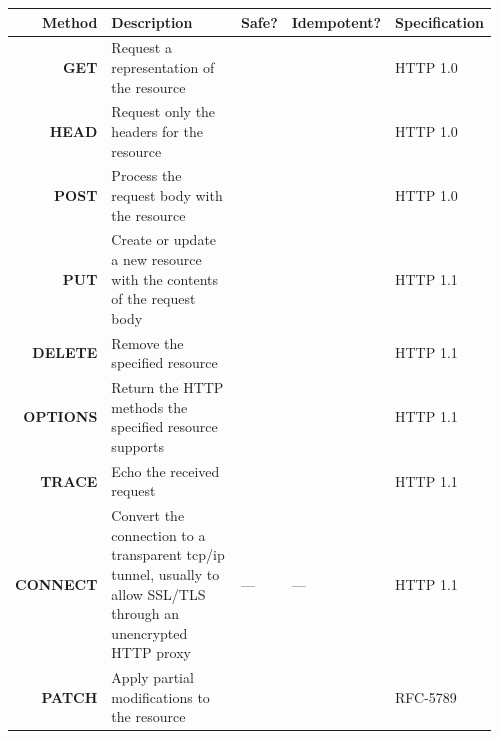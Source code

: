 \documentclass[final,table]{beamer}
\newcommand{\yes}{\color{green!60!black}{yes}}
\newcommand{\no}{\color{red}{no}}
\newcommand{\method}[1]{\textbf{#1}}
\begin{document}
\begin{frame}{}
    \begin{columns}
      \begin{column}{0.05\textwidth}
      \end{column}
      \begin{column}{0.9\textwidth}
        \begin{block}{}
          \Huge
          \begin{tabular}{r p{} l l l}
            Method & Description & Safe? & Idempotent? & Specification \\ \hline
            \method{GET} & Request a representation of the resource & \yes & \yes & HTTP 1.0 \\
            \method{HEAD} & Request only the headers for the resource & \yes & \yes &HTTP 1.0 \\
            \method{POST} & Process the request body with the resource & \no & \no & HTTP 1.0 \\
            \method{PUT} & Create or update a new resource with the contents of the request body & \no & \yes & HTTP 1.1 \\
            \method{DELETE} & Remove the specified resource & \no & \yes & HTTP 1.1 \\
            \method{OPTIONS} & Return the HTTP methods the specified resource supports & \yes & \yes & HTTP 1.1 \\
            \method{TRACE} & Echo the received request & \yes & \yes & HTTP 1.1 \\
            \method{CONNECT} & Convert the connection to a transparent tcp/ip tunnel, usually to allow SSL/TLS through an unencrypted HTTP proxy & --- & --- & HTTP 1.1 \\
            \method{PATCH} & Apply partial modifications to the resource & \no & \yes & RFC-5789 \\
          \end{tabular}
        \end{block}

        \vspace{0.5in}


\end{column}
\end{columns}
\end{frame}
\end{document}
